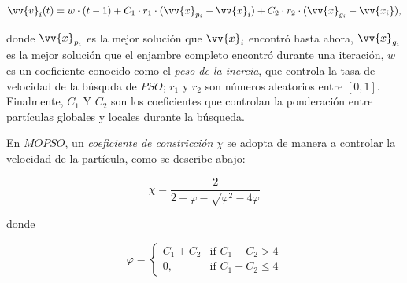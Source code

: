 \begin{equation}\label{eq:velocidad1}
 \vv{v}_i(t) = w \cdot (t-1) + C_1 \cdot r_1 \cdot (\vv{x}_{p_i} - \vv{x}_i) + C_2 \cdot r_2 \cdot (\vv{x}_{g_i} - \vv{x_i}) \text{,}
\end{equation}

donde $\vv{x}_{p_i}$ es la mejor solución que $\vv{x}_i$ encontró hasta ahora, $\vv{x}_{g_i}$ es la mejor solución que el enjambre completo encontró durante una iteración, $w$ es un coeficiente conocido como el \textit{peso de la inercia}, que controla la tasa de velocidad de la búsquda de $PSO$; $r_1$ y $r_2$ son números aleatorios entre $[0,1]$. Finalmente, $C_1$ Y $C_2$ son los coeficientes que controlan la ponderación entre partículas globales y locales durante la búsqueda.

En $MOPSO$, un \textit{coeficiente de constricción} $\chi$ se adopta de manera a controlar la velocidad de la partícula, como se describe abajo:

\begin{equation}
\chi = \frac{2}{2 - \varphi - \sqrt{\varphi^2 - 4 \varphi}}
\end{equation}





donde


\begin{equation}
    \varphi= 
\begin{cases}
    C_1 + C_2 & \text{if } C_1 + C_2 > 4\\
    0,              & \text{if } C_1 + C_2 \leq 4
\end{cases}
\end{equation}

